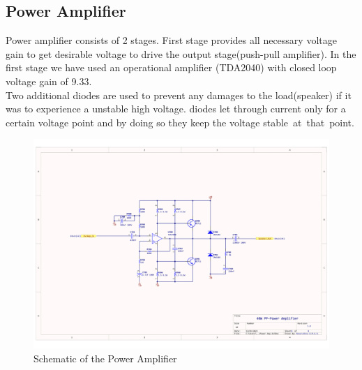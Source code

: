 \documentclass{article}
\begin{document}
            \subsection{Power Amplifier}
                Power amplifier consists of 2 stages. First stage provides all necessary voltage gain to get desirable voltage to drive the output stage(push-pull amplifier). In the first stage we have used an operational amplifier (TDA2040) with closed loop voltage gain of 9.33.\\

                Two additional diodes are used to prevent any damages to the load(speaker) if it was to experience a unstable high voltage. diodes let through current only for a certain voltage point and by doing so they keep the voltage stable at that point.
                \begin{figure}
                    \centering
                    \includegraphics[scale=0.4]{poweramp.png}
                    \caption{Schematic of the Power Amplifier}
                    \label{fig:enter-label}
                \end{figure}
                
\end{document}
